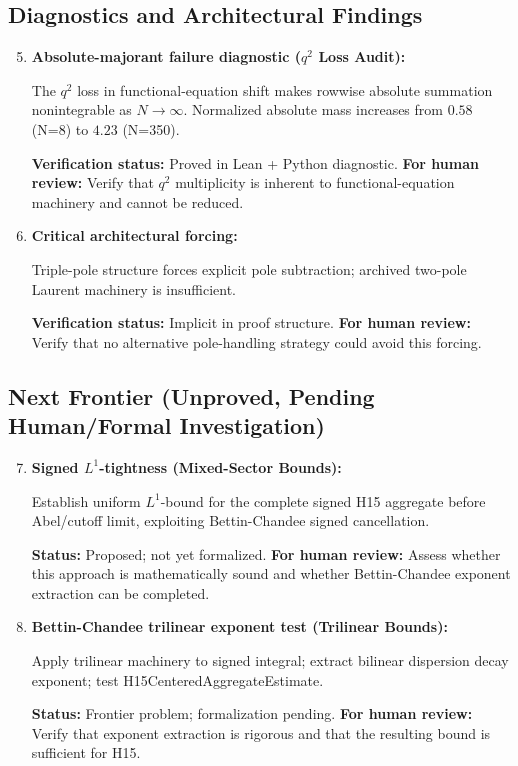 \documentclass[11pt,a4paper]{article}
\theoremstyle{plain}
\theoremstyle{definition}
\theoremstyle{remark}
\begin{document}
\subsection{Diagnostics and Architectural Findings}

\begin{enumerate}
  \setcounter{enumi}{4}
  \item \textbf{Absolute-majorant failure diagnostic ($q^2$ Loss Audit):}

  The $q^2$ loss in functional-equation shift makes rowwise absolute summation nonintegrable as $N \to \infty$. Normalized absolute mass increases from $0.58$ (N=8) to $4.23$ (N=350).

  \textbf{Verification status:} Proved in Lean + Python diagnostic. \textbf{For human review:} Verify that $q^2$ multiplicity is inherent to functional-equation machinery and cannot be reduced.

  \item \textbf{Critical architectural forcing:}

  Triple-pole structure forces explicit pole subtraction; archived two-pole Laurent machinery is insufficient.

  \textbf{Verification status:} Implicit in proof structure. \textbf{For human review:} Verify that no alternative pole-handling strategy could avoid this forcing.
\end{enumerate}

\subsection{Next Frontier (Unproved, Pending Human/Formal Investigation)}

\begin{enumerate}
  \setcounter{enumi}{6}
  \item \textbf{Signed $L^1$-tightness (Mixed-Sector Bounds):}

  Establish uniform $L^1$-bound for the complete signed H15 aggregate before Abel/cutoff limit, exploiting Bettin-Chandee signed cancellation.

  \textbf{Status:} Proposed; not yet formalized. \textbf{For human review:} Assess whether this approach is mathematically sound and whether Bettin-Chandee exponent extraction can be completed.

  \item \textbf{Bettin-Chandee trilinear exponent test (Trilinear Bounds):}

  Apply trilinear machinery to signed integral; extract bilinear dispersion decay exponent; test H15CenteredAggregateEstimate.

  \textbf{Status:} Frontier problem; formalization pending. \textbf{For human review:} Verify that exponent extraction is rigorous and that the resulting bound is sufficient for H15.
\end{enumerate}
\end{document}

